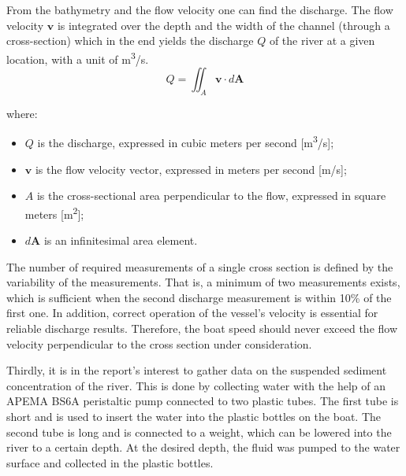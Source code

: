 From the bathymetry and the flow velocity one can find the discharge. The flow velocity \(\mathbf{v}\) is integrated over the depth and the width of the channel (through a cross-section) which in the end yields the discharge \(Q\) of the river at a given location, with a unit of m\textsuperscript{3}/s.
\begin{equation}
    Q = \iint_A \mathbf{v} \cdot d\mathbf{A}
    \label{eq:discharge_integration}
\end{equation}

\noindent where:
\begin{itemize}
    \item \(Q\) is the discharge, expressed in cubic meters per second [m\textsuperscript{3}/s];
    \item \(\mathbf{v}\) is the flow velocity vector, expressed in meters per second [m/s];
    \item \(A\) is the cross-sectional area perpendicular to the flow, expressed in square meters [m\textsuperscript{2}];
    \item \(d\mathbf{A}\) is an infinitesimal area element.
\end{itemize}

The number of required measurements of a single cross section is defined by the variability of the measurements. That is, a minimum of two measurements exists, which is sufficient when the second discharge measurement is within 10\% of the first one. In addition, correct operation of the vessel's velocity is essential for reliable discharge results. Therefore, the boat speed should never exceed the flow velocity perpendicular to the cross section under consideration. 






Thirdly, it is in the report's interest to gather data on the suspended sediment concentration of the river. This is done by collecting water with the help of an APEMA BS6A peristaltic pump connected to two plastic tubes. The first tube is short and is used to insert the water into the plastic bottles on the boat. The second tube is long and is connected to a weight, which can be lowered into the river to a certain depth. At the desired depth, the fluid was pumped to the water surface and collected in the plastic bottles.

